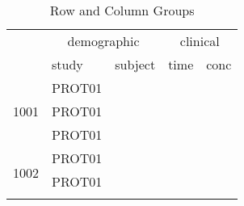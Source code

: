\documentclass[titlepage]{article}
\begin{document}
\begin{Schunk}
\begin{table}[H]
 \caption[Row and Column Groups]{Row and Column Groups }
 \begin{center}
  \begin{tabular}{l|lr|rr}
    \hline \hline
   \multicolumn{1}{c|}{} & \multicolumn{2}{c|}{demographic} & \multicolumn{2}{c}{clinical} \\
     & study & subject & time & conc \\ \hline
   \multirow{3}{*}{1001} & PROT01 & \verb#1001# & \verb#0# & \verb#0.12# \\
                          & PROT01 & \verb#1001# & \verb#1# & \verb#34.00# \\
                          & PROT01 & \verb#1001# & \verb#2# & \verb#5.60# \\ \hline
   \multirow{3}{*}{1002} & PROT01 & \verb#1002# & \verb#0# & \verb#0.50# \\
                          & PROT01 & \verb#1002# & \verb#1# & \verb#200.00# \\
                          &  & \verb#1002# & \verb#2# & \verb## \\ \hline
  \end{tabular}
 \end{center}
\end{table}\end{Schunk}
\end{document}
